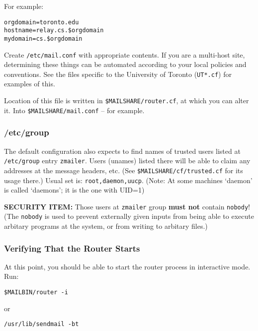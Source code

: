 For example:
\begin{tscreen}
\begin{verbatim}
orgdomain=toronto.edu
hostname=relay.cs.$orgdomain
mydomain=cs.$orgdomain
\end{verbatim}
\end{tscreen}

Create {\tt /etc/mail.conf} with appropriate contents.  If you are a
multi-host site, determining these things can be automated according
to your local policies and conventions.  See the files specific to
the University of Toronto ({\tt UT*.cf}) for examples of this.

Location of this file is written in {\tt \$MAILSHARE/router.cf}, at which
you can alter it. Into {\tt \$MAILSHARE/mail.conf} -- for example.


\subsubsection{/etc/group}

The default configuration also expects to find names of trusted users
listed at  {\tt /etc/group} entry {\tt zmailer}.  Users (unames) listed there
will be able to claim any addresses at the message headers, etc.
(See {\tt \$MAILSHARE/cf/trusted.cf} for its usage there.)
Usual set is: {\tt root,daemon,uucp}.
(Note: At some machines `daemon' is called `daemons'; it is
the one with UID=1)

{\bf SECURITY ITEM:} Those users at {\tt zmailer} group {\bf must not} contain {\tt nobody}!
(The {\tt nobody} is used to prevent externally given inputs from being
able to execute arbitary programs at the system, or from writing to
arbitary files.)




\subsubsection{Verifying That the Router Starts}

At this point, you should be able to start the router process in
interactive mode.  Run:
\begin{tscreen}
\begin{verbatim}
$MAILBIN/router -i
\end{verbatim}
\end{tscreen}

or
\begin{tscreen}
\begin{verbatim}
/usr/lib/sendmail -bt
\end{verbatim}
\end{tscreen}

